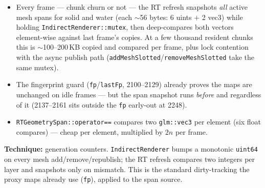 \documentclass[11pt,a4paper]{article}
\begin{document}
\begin{itemize}
    \item Every frame --- chunk churn or not --- the RT refresh snapshots \emph{all} active mesh spans for solid and water (each $\sim$56 bytes: 6 uints $+$ 2 vec3) while holding \texttt{IndirectRenderer::mutex}, then deep-compares both vectors element-wise against last frame's copies. At a few thousand resident chunks this is $\sim$100--200\,KB copied and compared per frame, plus lock contention with the async publish path (\texttt{addMeshSlotted}/\texttt{removeMeshSlotted} take the same mutex).
    \item The fingerprint guard (\texttt{fp}/\texttt{lastFp}, 2100--2129) already proves the maps are unchanged on idle frames --- but the span snapshot runs \emph{before} and regardless of it (2137--2161 sits outside the \texttt{fp} early-out at 2248).
    \item \texttt{RTGeometrySpan::operator==} compares two \texttt{glm::vec3} per element (six float compares) --- cheap per element, multiplied by $2n$ per frame.
\end{itemize}

\textbf{Technique:} generation counters. \texttt{IndirectRenderer} bumps a monotonic \texttt{uint64} on every mesh add/remove/republish; the RT refresh compares two integers per layer and snapshots only on mismatch. This is the standard dirty-tracking the proxy maps already use (\texttt{fp}), applied to the span source.
\end{document}
